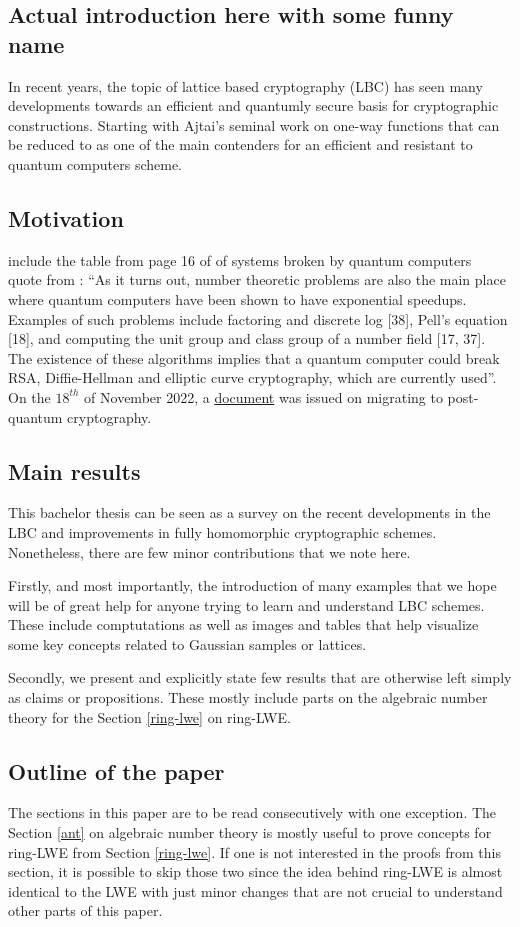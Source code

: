 \subsection{Actual introduction here with some funny name}
In recent years, the topic of lattice based cryptography (LBC) has seen many developments towards an efficient and quantumly secure basis for cryptographic constructions. Starting with Ajtai's seminal work \cite{ajtai} on one-way functions that can be reduced to  as one of the main contenders for an efficient and resistant to quantum computers scheme.
\subsection{Motivation}
include the table from page 16 of \cite{bernstein} of systems broken by quantum computers\\
quote from \cite{bernstein}: ``As it turns out, number theoretic problems are also the main place where quantum computers have been shown to have exponential speedups. Examples of such problems include factoring and discrete log [38], Pell’s equation [18], and computing the unit group and class group of a number field [17, 37]. The existence of these algorithms implies that a quantum computer could break RSA, Diffie-Hellman and elliptic curve cryptography, which are currently used''.\\
On the $18^{th}$ of November 2022, a \href{https://www.whitehouse.gov/wp-content/uploads/2022/11/M-23-02-M-Memo-on-Migrating-to-Post-Quantum-Cryptography.pdf}{document} was issued on migrating to post-quantum cryptography.
\subsection{Main results}
This bachelor thesis can be seen as a survey on the recent developments in the LBC and improvements in fully homomorphic cryptographic schemes. Nonetheless, there are few minor contributions that we note here.

Firstly, and most importantly, the introduction of many examples that we hope will be of great help for anyone trying to learn and understand LBC schemes. These include comptutations as well as images and tables that help visualize some key concepts related to Gaussian samples or lattices.

Secondly, we present and explicitly state few results that are otherwise left simply as claims or propositions. These mostly include parts on the algebraic number theory for the Section \ref{ring-lwe} on ring-LWE.
\subsection{Outline of the paper}
The sections in this paper are to be read consecutively with one exception. The Section \ref{ant} on algebraic number theory is mostly useful to prove concepts for ring-LWE from Section \ref{ring-lwe}. If one is not interested in the proofs from this section, it is possible to skip those two since the idea behind ring-LWE is almost identical to the LWE with just minor changes that are not crucial to understand other parts of this paper.

